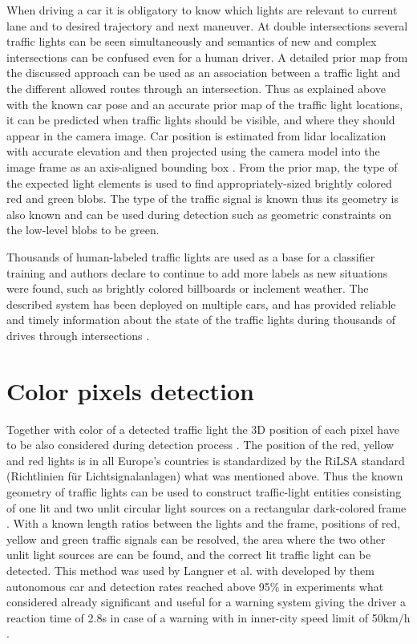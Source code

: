 \documentclass[letterpaper, 10 pt, conference]{ieeeconf} %
\begin{document}
When driving a car it is obligatory to know which lights are relevant to current lane and to desired trajectory and next maneuver. At double intersections several traffic lights can be seen simultaneously and semantics of new and complex intersections can be confused even for a human driver. A detailed prior map from the discussed approach can be used as an association between a traffic light and the different allowed routes through an intersection. Thus as explained above with the known car pose and an accurate prior map of the traffic light locations, it can be predicted when traffic lights should be visible, and where they should appear in the camera image. Car position is estimated from lidar localization with accurate elevation and then projected using the camera model into the image frame as an axis-aligned bounding box \cite{c5}. From the prior map, the type of the expected light elements is used to find appropriately-sized brightly colored red and green blobs. The type of the traffic signal is known thus its geometry is also known and can be used during detection such as geometric constraints on the low-level blobs to be green. 

Thousands of human-labeled traffic lights are used as a base for a classifier training and authors declare to continue to add more labels as new situations were found, such as brightly colored billboards or inclement weather. The described system has been deployed on multiple cars, and has provided reliable and timely information about the state of the traffic lights during thousands of drives through intersections \cite{c5}. 
 
 
\section{Color pixels detection}
Together with color of a detected traffic light the 3D position of each pixel have to be also considered during detection process \cite{c4}. The position of the red, yellow and red lights is in all Europe's countries is standardized by the RiLSA standard (Richtlinien f\"ur Lichtsignalanlagen) what was mentioned above. Thus the known geometry of traffic lights can be used to construct traffic-light entities consisting of one lit and two unlit circular light sources on a rectangular dark-colored frame \cite{c4}.
With a known length ratios between the lights and the frame, positions of red, yellow and green traffic signals can be resolved, the area where the two other unlit light sources are can be found, and the correct lit traffic light can be detected. This method was used by Langner et al. with developed by them autonomous car and detection rates reached above 95\% in experiments what considered already significant and useful for a warning system giving the driver a reaction time of 2.8s in case of a warning with in inner-city speed limit of 50km/h \cite{c4}.
\end{document}

